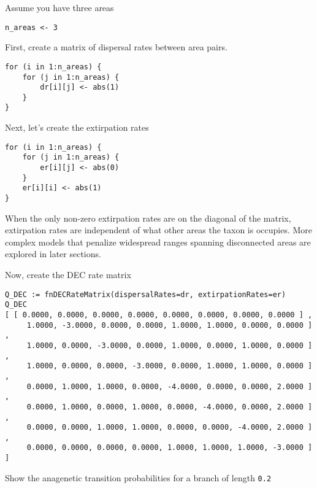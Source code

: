 Assume you have three areas

\begin{snugshade}
\begin{lstlisting}
n_areas <- 3
\end{lstlisting}
\end{snugshade}

First, create a matrix of dispersal rates between area pairs.

\begin{snugshade}
\begin{lstlisting}
for (i in 1:n_areas) {
    for (j in 1:n_areas) {
        dr[i][j] <- abs(1)
    }
}
\end{lstlisting}
\end{snugshade}

Next, let's create the extirpation rates

\begin{snugshade}
\begin{lstlisting}
for (i in 1:n_areas) {
    for (j in 1:n_areas) {
        er[i][j] <- abs(0)
    }
    er[i][i] <- abs(1) 
}
\end{lstlisting}
\end{snugshade}

When the only non-zero extirpation rates are on the diagonal of the matrix, extirpation rates are independent of what other areas the taxon is occupies.
More complex models that penalize widespread ranges spanning disconnected areas are explored in later sections.

Now, create the DEC rate matrix

\begin{snugshade}
\begin{lstlisting}
Q_DEC := fnDECRateMatrix(dispersalRates=dr, extirpationRates=er)
Q_DEC
[ [ 0.0000, 0.0000, 0.0000, 0.0000, 0.0000, 0.0000, 0.0000, 0.0000 ] ,
     1.0000, -3.0000, 0.0000, 0.0000, 1.0000, 1.0000, 0.0000, 0.0000 ] ,
     1.0000, 0.0000, -3.0000, 0.0000, 1.0000, 0.0000, 1.0000, 0.0000 ] ,
     1.0000, 0.0000, 0.0000, -3.0000, 0.0000, 1.0000, 1.0000, 0.0000 ] ,
     0.0000, 1.0000, 1.0000, 0.0000, -4.0000, 0.0000, 0.0000, 2.0000 ] ,
     0.0000, 1.0000, 0.0000, 1.0000, 0.0000, -4.0000, 0.0000, 2.0000 ] ,
     0.0000, 0.0000, 1.0000, 1.0000, 0.0000, 0.0000, -4.0000, 2.0000 ] ,
     0.0000, 0.0000, 0.0000, 0.0000, 1.0000, 1.0000, 1.0000, -3.0000 ] ]
\end{lstlisting}
\end{snugshade}

Show the anagenetic transition probabilities for a branch of length {\tt 0.2}

